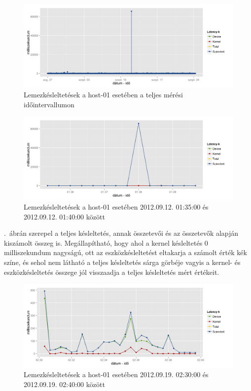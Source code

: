 \documentclass[a4paper,10pt,titlepage]{article}
\begin{document}
\begin{figure}[h!]
\centering
\includegraphics[width=1.00\textwidth]{figures/disk_metrics_sumlatency-20120826230140-20120924083120.png}
\caption{ Lemezkésleltetések a host-01 esetében a teljes mérési időintervallumon \label{fig:disk_metrics_sumlatency-01}}
\end{figure}

\begin{figure}[h!]
\centering
\includegraphics[width=1.00\textwidth]{figures/disk_metrics_sumlatency-20120912013500-20120912014000.png}
\caption{ Lemezkésleltetések a host-01 esetében 2012.09.12. 01:35:00 és 2012.09.12. 01:40:00 között \label{fig:disk_metrics_sumlatency-02}}
\end{figure}

.~ábrán szerepel a teljes késleltetés, annak összetevői és az összetevők alapján kiszámolt összeg is. Megállapítható, hogy ahol a kernel késleltetés 0 milliszekundum nagyságú, ott az eszközkésleltetést eltakarja a számolt érték kék színe, és sehol nem látható a teljes késleltetés sárga görbéje vagyis a kernel- és eszközkésleltetés összege jól visszaadja a teljes késleltetés mért értékeit.

\begin{figure}[h!]
\centering
\includegraphics[width=1.00\textwidth]{figures/disk_metrics_sumlatency-20120919023000-20120919024000.png}
\caption{ Lemezkésleltetések a host-01 esetében 2012.09.19. 02:30:00 és 2012.09.19. 02:40:00 között \label{fig:disk_metrics_sumlatency-03}}
\end{figure}
\end{document}
